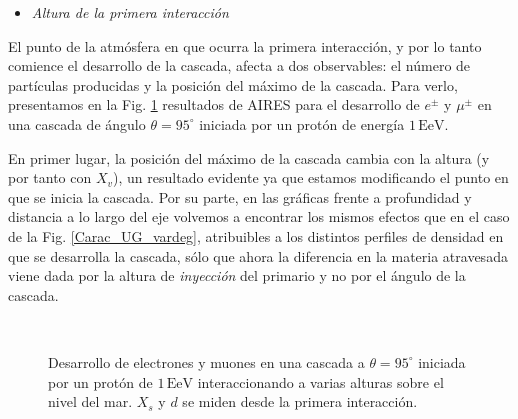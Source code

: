 \documentclass[11 pt, a4paper]{article} %
\numberwithin{equation}{section}
\numberwithin{figure}{section}
\numberwithin{table}{section}
\begin{document}
\clearpage
\begin{itemize}
	\item \textit{Altura de la primera interacción}
\end{itemize}
El punto de la atmósfera en que ocurra la primera interacción, y por lo tanto comience el desarrollo de la cascada, afecta a dos observables: el número de partículas producidas y la posición del máximo de la cascada. Para verlo, presentamos en la Fig. \ref{Carac_UG_varh} resultados de AIRES para el desarrollo de $e^\pm$ y $\mu^\pm$ en una cascada de ángulo $\theta=95^\circ$ iniciada por un protón de energía $1\,\mathrm{EeV}$.

En primer lugar, la posición del máximo de la cascada cambia con la altura (y por tanto con $X_v$), un resultado evidente ya que estamos modificando el punto en que se inicia la cascada. Por su parte, en las gráficas frente a profundidad y distancia  a lo largo del eje volvemos a encontrar los mismos efectos que en el caso de la Fig. \ref{Carac_UG_vardeg}, atribuibles a los distintos perfiles de densidad en que se desarrolla la cascada, sólo que ahora la diferencia en la materia atravesada viene dada por la altura de \textit{inyección} del primario y no por el ángulo de la cascada.
\begin{figure}[H]
	\centering
	\\

	\caption{Desarrollo de electrones y muones en una cascada a $\theta = 95^\circ$ iniciada por un protón de $1\,\mathrm{EeV}$ interaccionando a varias alturas sobre el nivel del mar. $X_s$ y $d$ se miden desde la primera interacción.}
	\label{Carac_UG_varh}
\end{figure}
\end{document}
